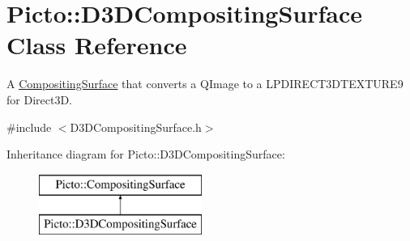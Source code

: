 \hypertarget{class_picto_1_1_d3_d_compositing_surface}{\section{Picto\-:\-:D3\-D\-Compositing\-Surface Class Reference}
\label{class_picto_1_1_d3_d_compositing_surface}
}


A \hyperlink{struct_picto_1_1_compositing_surface}{Compositing\-Surface} that converts a Q\-Image to a L\-P\-D\-I\-R\-E\-C\-T3\-D\-T\-E\-X\-T\-U\-R\-E9 for Direct3\-D.  




{\ttfamily \#include $<$D3\-D\-Compositing\-Surface.\-h$>$}

Inheritance diagram for Picto\-:\-:D3\-D\-Compositing\-Surface\-:\begin{figure}[H]
\begin{center}
\leavevmode
\includegraphics[height=2.000000cm]{class_picto_1_1_d3_d_compositing_surface}
\end{center}
\end{figure}
